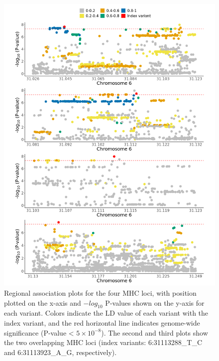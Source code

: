       \begin{figure}[H] 
        \centering    
        \includegraphics[width=1.0\textwidth]{Vector/ukbb_mhc_regional_assoc_plots.png}
        \caption[Figure]{Regional association plots for the four MHC loci, with position plotted on the x-axis and $-log_{10}$ P-values shown on the y-axis for each variant. Colors indicate the LD value of each variant with the index variant, and the red horizontal line indicates genome-wide significance (P-value < $5\times10^{-8}$). The second and third plots show the two overlapping MHC loci (index variants: 6:31113288\_T\_C and 6:31113923\_A\_G, respectively).}
        \label{fig:ukbb_mhc_regional_assoc_plots}
        \end{figure}

